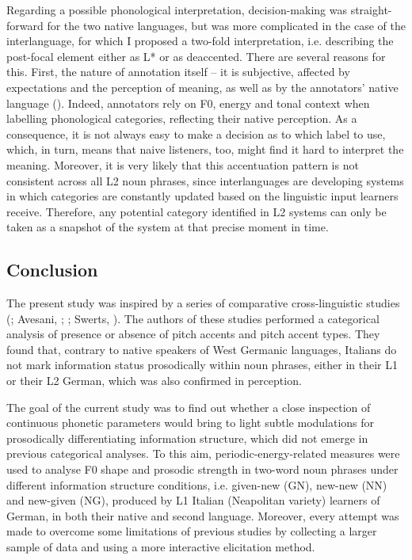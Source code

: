 Regarding a possible phonological interpretation, decision-making was straight-forward for the two native languages, but was more complicated in the case of the interlanguage, for which I proposed a two-fold interpretation, i.e. describing the post-focal element either as L* or as deaccented. There are several reasons for this. First, the nature of annotation itself – it is subjective, affected by expectations and the perception of meaning, as well as by the annotators’ native language (\citealt{CangemiGrice2016}). Indeed, annotators rely on F0, energy and tonal context when labelling phonological categories, reflecting their native perception. As a consequence, it is not always easy to make a decision as to which label to use, which, in turn, means that naive listeners, too, might find it hard to interpret the meaning. Moreover, it is very likely that this accentuation pattern is not consistent across all L2 noun phrases, since interlanguages are developing systems in which categories are constantly updated based on the linguistic input learners receive. Therefore, any potential category identified in L2 systems can only be taken as a snapshot of the system at that precise moment in time.

\subsection{Conclusion}
\hypertarget{Toc191305922}{}
The present study was inspired by a series of comparative cross-linguistic studies (\citealt{AvesaniEtAl2013}; Avesani, \citealt{BocciVayra2015}; \citealt{KrahmerSwerts2008}; Swerts, \citealt{KrahmerAvesani2002}). The authors of these studies performed a categorical analysis of presence or absence of pitch accents and pitch accent types. They found that, contrary to native speakers of West Germanic languages, Italians do not mark information status prosodically within noun phrases, either in their L1 or their L2 German, which was also confirmed in perception.

The goal of the current study was to find out whether a close inspection of continuous phonetic parameters would bring to light subtle modulations for prosodically differentiating information structure, which did not emerge in previous categorical analyses. To this aim, periodic-energy-related measures were used to analyse F0 shape and prosodic strength in two-word noun phrases under different information structure conditions, i.e. given-new (GN), new-new (NN) and new-given (NG), produced by L1 Italian (Neapolitan variety) learners of German, in both their native and second language. Moreover, every attempt was made to overcome some limitations of previous studies by collecting a larger sample of data and using a more interactive elicitation method.

